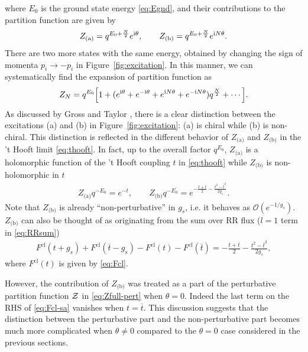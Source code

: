 \documentclass[11pt]{article}
\newcommand{\ri}{{\rm i}}
\def\th{\theta}
\def\b#1{\overline{#1}}
\renewcommand{\[}{\begin{eqnarray}}
\renewcommand{\]}{\end{eqnarray}}
\newcommand{\Zeven}{{\cal Z}}
\begin{document}
where $E_0$ is the ground state energy \eqref{eq:Egnd},
and their contributions to the partition function are given by
\begin{align}
  Z_{\text{(a)}}=q^{E_0+\frac{N}{2}}e^{\ri\th},\qquad
Z_{\text{(b)}}=q^{E_0+\frac{N}{2}}e^{\ri N\th}.
\label{eq:Zab}
\end{align}
There are two more states with the same energy,
obtained by changing the sign of momenta $p_i\to-p_i$ in Figure~\ref{fig:excitation}.
In this manner, we can systematically find
the expansion of partition function as
\begin{align}
 Z_N=q^{E_0}\Bigl[1+(e^{\ri\th}+e^{-\ri\th}+e^{\ri N\th}+e^{-\ri N\th})q^{\frac{N}{2}}+\cdots\Bigr].
\label{eq:Z-th}
\end{align}
As discussed by Gross and Taylor \cite{Gross:1992tu,Gross:1993hu,Gross:1993yt},
there is a clear distinction between the excitations (a) and (b) in  Figure~\ref{fig:excitation}:
(a) is chiral while (b) is non-chiral.
This distinction is reflected in the different behavior of
$Z_{\text{(a)}}$ and $Z_{\text{(b)}}$ in the 't Hooft limit \eqref{eq:thooft}. 
In fact, up to the overall factor $q^{E_0}$, $Z_{\text{(a)}}$ is
a holomorphic function of the 't Hooft coupling $t$ in \eqref{eq:thooft}
while $Z_{\text{(b)}}$ is non-holomorphic in $t$
\begin{equation}
\begin{aligned}
 Z_{\text{(a)}}q^{-E_0}=e^{-t},\qquad
Z_{\text{(b)}}q^{-E_0}=e^{-\frac{t+\b{t}}{2}-\frac{t^2-\b{t}^2}{2g_s}}.
\end{aligned} 
\end{equation}
Note that $Z_{\text{(b)}}$ is already ``non-perturbative'' in $g_s$, 
i.e. it behaves as $\mathcal{O}(e^{-1/g_s})$. 
$Z_{\text{(b)}}$ can also be thought of as originating from the sum over RR flux ($l=1$ term in \eqref{eq:RRsum})
\begin{align}
 F^{\text{cl}}(t+ g_s)+ F^{\text{cl}}(\b{t}- g_s)-F^{\text{cl}}(t)
-F^{\text{cl}}(\b{t})=-\frac{t+\b{t}}{2}-\frac{t^2-\b{t}^2}{2g_s},
\label{eq:Fcl-sa}
\end{align}
where $ F^{\text{cl}}(t)$ is given by \eqref{eq:Fcl}.

However, the contribution of $Z_{\text{(b)}}$ was treated as a part of
the perturbative partition function $\Zeven$ in \eqref{eq:Zfull-pert} when 
$\th=0$. Indeed the last term on the RHS of \eqref{eq:Fcl-sa}
vanishes when $t=\b{t}$.
This discussion  suggests that the distinction between the 
perturbative part and the non-perturbative part becomes 
much more complicated when $\th\ne0$ compared to the $\th=0$ case considered in
the previous sections.
\end{document}
